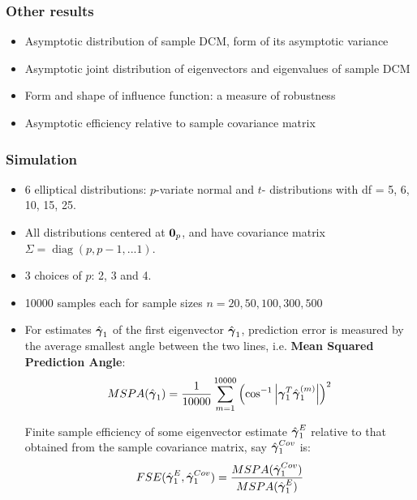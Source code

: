 \documentclass[handout,10pt]{beamer}
\DeclareMathOperator*{\diag}{diag}
\begin{document}
\begin{frame}
\frametitle{Other results}
\begin{itemize}
\item Asymptotic distribution of sample DCM, form of its asymptotic variance
\vspace{.2cm}

\item Asymptotic joint distribution of eigenvectors and eigenvalues of sample DCM
\vspace{.2cm}

\item Form and shape of influence function: a measure of robustness
\vspace{.2cm}

\item Asymptotic efficiency relative to sample covariance matrix
\end{itemize}
\end{frame}

\begin{frame}
\frametitle{Simulation}
\begin{itemize}
\item 6 elliptical distributions: $p$-variate normal and $t$- distributions with df = 5, 6, 10, 15, 25.
\vspace{.2cm}

\item All distributions centered at ${\bf 0}_p$, and have covariance matrix $\Sigma = \diag(p,p-1,...1)$. 
\vspace{.2cm}

\item 3 choices of $p$: 2, 3 and 4.
\vspace{.2cm}

\item 10000 samples each for sample sizes $n = 20, 50, 100, 300, 500$
\vspace{.2cm}

\item For estimates $\hat{{\boldsymbol{\gamma}}}_1$ of the first eigenvector $\hat{{\boldsymbol{\gamma}}}_1$, prediction error is measured by the average smallest angle between the two lines, i.e. \textbf{Mean Squared Prediction Angle}:
$$ MSPA(\hat {{\boldsymbol{\gamma}}}_1) = \frac{1}{10000} \sum_{m=1}^{10000} \left( \cos^{-1} \left|{\boldsymbol{\gamma}}_1^T \hat{{\boldsymbol{\gamma}}}^{(m)}_1 \right| \right)^2 $$

Finite sample efficiency of some eigenvector estimate $\hat{{\boldsymbol{\gamma}}}^E_1$ relative to that obtained from the sample covariance matrix, say $\hat{{\boldsymbol{\gamma}}}^{Cov}_1$ is:
$$ FSE(\hat{{\boldsymbol{\gamma}}}^E_1, \hat{{\boldsymbol{\gamma}}}^{Cov}_1) = \frac{MSPA(\hat{{\boldsymbol{\gamma}}}^{Cov}_1)}{MSPA(\hat{{\boldsymbol{\gamma}}}^E_1)} $$
\end{itemize}
\end{frame}
\end{document}
